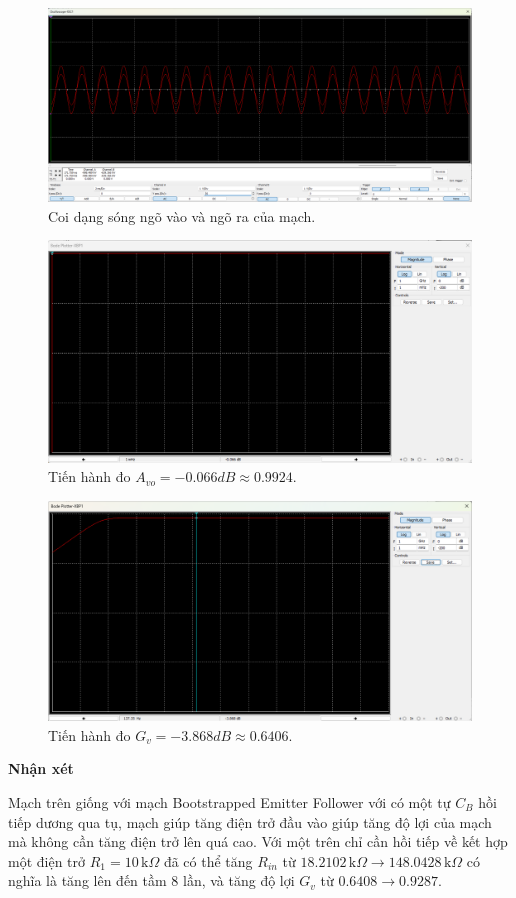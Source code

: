 \begin{itemize}[label=-]
	\begin{figure}[H]
		\centering
		\includegraphics[width=.8\linewidth]{./my-chapters/my-images/Question4/cauc_wave.png}
		\caption{Coi dạng sóng ngõ vào và ngõ ra của mạch.}
	\end{figure}
	
	\begin{figure}[H]
		\centering
		\includegraphics[width=.8\linewidth]{./my-chapters/my-images/Question4/cau_c_bode_avo.png}
		\caption{Tiến hành đo $A_{vo} = -0.066dB \approx 0.9924$.}
	\end{figure}
	
	\begin{figure}[H]
		\centering
		\includegraphics[width=.8\linewidth]{./my-chapters/my-images/Question4/cau_c_bode_gv.png}
		\caption{Tiến hành đo $G_{v} = -3.868dB \approx 0.6406$.}
	\end{figure}
\end{itemize}

\noindent\textbf{Nhận xét}

Mạch trên giống với mạch Bootstrapped Emitter Follower với có một tự $C_{B}$ hồi tiếp dương qua tụ, mạch giúp tăng điện trở đầu vào giúp tăng độ lợi của mạch mà không cần tăng điện trở lên quá cao. Với một trên chỉ cần hồi tiếp về kết hợp một điện trở $R_{1} = 10 \,\text{k}\Omega$ đã có thể tăng $R_{in}$ từ $18.2102\,\text{k}\Omega \rightarrow 148.0428 \,\text{k}\Omega$ có nghĩa là tăng lên đến tầm $8$ lần, và tăng độ lợi $G_{v}$ từ $0.6408 \rightarrow 0.9287$.